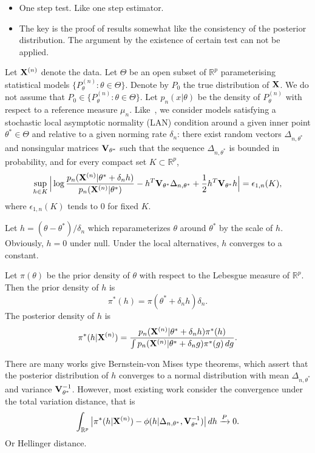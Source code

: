 \documentclass[3p]{elsarticle}
\theoremstyle{plain}
\theoremstyle{definition}
\theoremstyle{remark}
\begin{document}
{\color{red}
\begin{itemize}
    \item
One step test. Like one step estimator.
\item
    The key is the proof of results somewhat like the consistency of the posterior distribution. The argument by the existence of certain test can not be applied.
\end{itemize}
}

Let $\mathbf{X}^{(n)}$ denote the data.
Let $\Theta$ be an open subset of $\mathbb{R}^p$ parameterising statistical models $\{P_{\theta}^{(n)}:\theta\in \Theta\}$. 
Denote by $P_0$ the true distribution of $\mathbf{X}$.
We do not assume that $P_0\in  \{P_{\theta}^{(n)}:\theta\in \Theta\}$.
Let $p_{n}(x|\theta)$ be the density of  $P_{\theta}^{(n)}$ with respect to a reference measure $\mu_n$.
Like~\cite{Kleijn2012The}, we consider models satisfying a stochastic local asymptotic normality (LAN) condition around a given inner point $\theta^* \in \Theta$ and relative to a given norming rate $\delta_n$: there exist random vectors $\Delta_{n,\theta^*}$ and nonsingular matrices $\mathbf{V}_{\theta^*}$ such that  {\color{red}the sequence $\Delta_{n,\theta^*}$ is bounded in probability}, and for every compact set $K\subset \mathbb{R}^p$,
$$
\sup_{h\in K}
\Big|
\log\frac{p_n(\mathbf{X}^{(n)}|\theta^*+\delta_n h)}{p_{n}(\mathbf{X}^{(n)}|\theta^*)}
-h^T \mathbf{V}_{\theta^*}\Delta_{n,\theta^*}+\frac{1}{2} h^T \mathbf{V}_{\theta^*} h
\Big|
=\epsilon_{1,n}(K),
$$
where $\epsilon_{1,n}(K)$ tends to $0$ for fixed $K$.





Let $h=(\theta-\theta^*)/\delta_n$ which reparameterizes $\theta$ around $\theta^*$ by the scale of $h$.
Obviously, $h=0$ under null.
Under the local alternatives, $h$ converges to a constant.

Let $\pi(\theta)$ be the prior density of $\theta$ with respect to the Lebesgue measure of $\mathbb{R}^p$.
Then the prior density of $h$ is
$$
\pi^*(h)=\pi(\theta^*+\delta_n h)\delta_n.
$$
The posterior density of $h$ is
$$
\pi^*(h|\mathbf{X}^{(n)})=\frac{p_n(\mathbf{X}^{(n)}|\theta^*+\delta_n h) \pi^*(h)}{\int p_n (\mathbf{X}^{(n)}|\theta^*+\delta_n g) \pi^*(g) \, dg}.
$$

There are many works give Bernstein-von Mises type theorems, which assert that the posterior distribution of $h$ converges to a normal distribution with mean $\Delta_{n,\theta^*}$ and variance $\mathbf{V}_{\theta^*}^{-1}$.
However, most existing work consider the convergence under the total variation distance, that is
$$
\int_{\mathbb{R}^p}\big|\pi^*(h|\mathbf{X}^{(n)})-\phi(h|\Delta_{n,\theta^*},\mathbf{V}_{\theta^*}^{-1})\big| \, dh \xrightarrow{P} 0.
$$
Or Hellinger distance.
\end{document}

